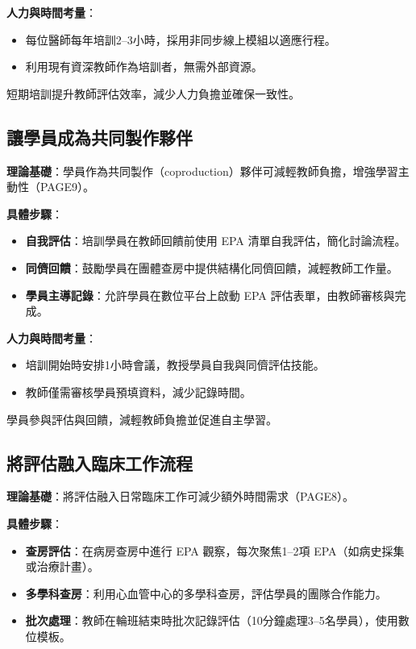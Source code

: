 \documentclass[12pt,a4paper]{article}
\newcommand{\note}[1]{
    \par
    \noindent
    \begin{tcolorbox}[
        colback=emergency_blue!5!white,
        colframe=emergency_blue,
        title=\textbf{重點提醒},
        fonttitle=\bfseries,
        boxrule=0.5pt,
        arc=3pt,
        left=6pt,
        right=6pt,
        top=6pt,
        bottom=6pt
    ]
    #1
    \end{tcolorbox}
}
\begin{document}
\textbf{人力與時間考量}：
\begin{itemize}[nosep]
    \item 每位醫師每年培訓2–3小時，採用非同步線上模組以適應行程。
    \item 利用現有資深教師作為培訓者，無需外部資源。
\end{itemize}

\vspace{0.5cm}
\note{
短期培訓提升教師評估效率，減少人力負擔並確保一致性。
}

\subsection{讓學員成為共同製作夥伴}
\textbf{理論基礎}：學員作為共同製作（coproduction）夥伴可減輕教師負擔，增強學習主動性（PAGE9）。

\textbf{具體步驟}：
\begin{itemize}[nosep]
    \item \textbf{自我評估}：培訓學員在教師回饋前使用 EPA 清單自我評估，簡化討論流程。
    \item \textbf{同儕回饋}：鼓勵學員在團體查房中提供結構化同儕回饋，減輕教師工作量。
    \item \textbf{學員主導記錄}：允許學員在數位平台上啟動 EPA 評估表單，由教師審核與完成。
\end{itemize}

\textbf{人力與時間考量}：
\begin{itemize}[nosep]
    \item 培訓開始時安排1小時會議，教授學員自我與同儕評估技能。
    \item 教師僅需審核學員預填資料，減少記錄時間。
\end{itemize}

\vspace{0.5cm}
\note{
學員參與評估與回饋，減輕教師負擔並促進自主學習。
}

\subsection{將評估融入臨床工作流程}
\textbf{理論基礎}：將評估融入日常臨床工作可減少額外時間需求（PAGE8）。

\textbf{具體步驟}：
\begin{itemize}[nosep]
    \item \textbf{查房評估}：在病房查房中進行 EPA 觀察，每次聚焦1–2項 EPA（如病史採集或治療計畫）。
    \item \textbf{多學科查房}：利用心血管中心的多學科查房，評估學員的團隊合作能力。
    \item \textbf{批次處理}：教師在輪班結束時批次記錄評估（10分鐘處理3–5名學員），使用數位模板。
\end{itemize}
\end{document}
